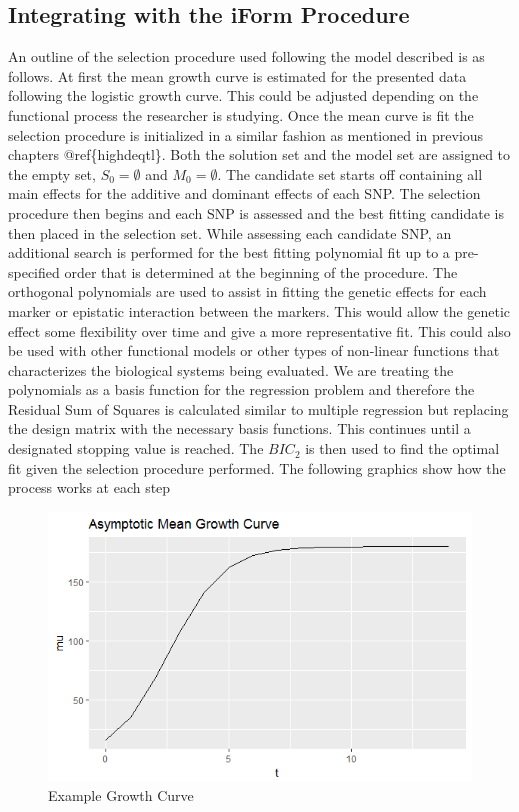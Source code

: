 \documentclass[11pt,]{book}
\theoremstyle{definition}
\theoremstyle{definition}
\theoremstyle{remark}
\begin{document}
\subsection{Integrating with the iForm
Procedure}\label{integrating-with-the-iform-procedure}

An outline of the selection procedure used following the model described
is as follows. At first the mean growth curve is estimated for the
presented data following the logistic growth curve. This could be
adjusted depending on the functional process the researcher is studying.
Once the mean curve is fit the selection procedure is initialized in a
similar fashion as mentioned in previous chapters @ref\{highdeqtl\}.
Both the solution set and the model set are assigned to the empty set,
\(S_0=\emptyset\) and \(M_0=\emptyset\). The candidate set starts off
containing all main effects for the additive and dominant effects of
each SNP. The selection procedure then begins and each SNP is assessed
and the best fitting candidate is then placed in the selection set.
While assessing each candidate SNP, an additional search is performed
for the best fitting polynomial fit up to a pre-specified order that is
determined at the beginning of the procedure. The orthogonal polynomials
are used to assist in fitting the genetic effects for each marker or
epistatic interaction between the markers. This would allow the genetic
effect some flexibility over time and give a more representative fit.
This could also be used with other functional models or other types of
non-linear functions that characterizes the biological systems being
evaluated. We are treating the polynomials as a basis function for the
regression problem and therefore the Residual Sum of Squares is
calculated similar to multiple regression but replacing the design
matrix with the necessary basis functions. This continues until a
designated stopping value is reached. The \(BIC_2\) is then used to find
the optimal fit given the selection procedure performed. The following
graphics show how the process works at each step

\begin{figure}

{\centering \includegraphics[width=0.8\linewidth]{images/GrowthCurveExample} 

}

\caption{Example Growth Curve}\label{fig:growth-example}
\end{figure}
\end{document}
